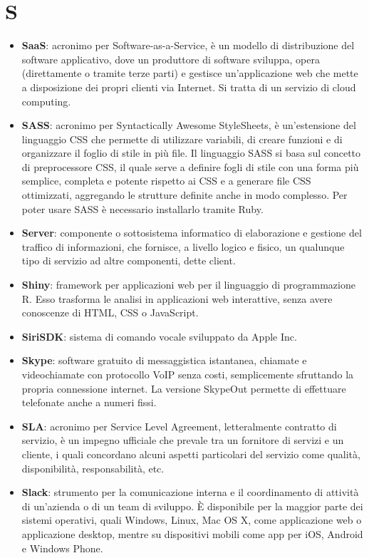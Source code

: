 \newpage
\section{S}

\begin{itemize}
	\item \textbf{SaaS}: acronimo per Software-as-a-Service, è un modello di distribuzione del software applicativo, dove un produttore di software sviluppa, opera (direttamente o tramite terze parti) e gestisce un'applicazione web che mette a disposizione dei propri clienti via Internet. Si tratta di un servizio di cloud computing.
	\item \textbf{SASS}: acronimo per Syntactically Awesome StyleSheets, è un'estensione del linguaggio CSS che permette di utilizzare variabili, di creare funzioni e di organizzare il foglio di stile in più file. Il linguaggio SASS si basa sul concetto di preprocessore CSS, il quale serve a definire fogli di stile con una forma più semplice, completa e potente rispetto ai CSS e a generare file CSS ottimizzati, aggregando le strutture definite anche in modo complesso. Per poter usare SASS è necessario installarlo tramite Ruby.
	\item \textbf{Server}: componente o sottosistema informatico di elaborazione e gestione del traffico di informazioni, che fornisce, a livello logico e fisico, un qualunque tipo di servizio ad altre componenti, dette client.
	\item \textbf{Shiny}: framework per applicazioni web per il linguaggio di programmazione R. Esso trasforma le analisi in applicazioni web interattive, senza avere conoscenze di HTML, CSS o JavaScript.
	\item \textbf{SiriSDK}: sistema di comando vocale sviluppato da Apple Inc.
	\item \textbf{Skype}: software gratuito di messaggistica istantanea, chiamate e videochiamate con protocollo VoIP senza costi, semplicemente sfruttando la propria connessione internet. La versione SkypeOut permette di effettuare telefonate anche a numeri fissi.
	\item \textbf{SLA}: acronimo per Service Level Agreement, letteralmente contratto di servizio, è un impegno ufficiale che prevale tra un fornitore di servizi e un cliente, i quali concordano alcuni aspetti particolari del servizio come qualità, disponibilità, responsabilità, etc.
	\item \textbf{Slack}: strumento per la comunicazione interna e il coordinamento di attività di un'azienda o di un team di sviluppo. \MakeUppercase{è} disponibile per la maggior parte dei sistemi operativi, quali Windows, Linux, Mac OS X, come applicazione web o applicazione desktop, mentre su dispositivi mobili come app per iOS, Android e Windows Phone.

\end{itemize}
